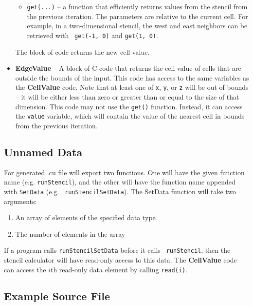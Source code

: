 \documentclass[11pt]{article}
\begin{document}
\begin{itemize}
\begin{itemize}
\item {\tt get(...)} -- a function that efficiently returns values
  from the stencil from the previous iteration.  The parameters are
  relative to the current cell.  For example, in a two-dimensional
  stencil, the west and east neighbors can be retrieved with {\tt
    get(-1, 0)} and {\tt get(1, 0)}.
\end{itemize}
The block of code returns the new cell value.
\item {\bf EdgeValue} -- A block of C code that returns the cell value
  of cells that are outside the bounds of the input.  This code has
  access to the same variables as the {\bf CellValue} code.  Note that
  at least one of {\tt x}, {\tt y}, or {\tt z} will be out of bounds
  -- it will be either less than zero or greater than or equal to the
  size of that dimension.  This code may not use the {\tt get()}
  function.  Instead, it can access the {\tt value} variable, which
  will contain the value of the nearest cell in bounds from the
  previous iteration.
\end{itemize}

\subsection{Unnamed Data}

For generated .cu file will export two functions.  One will have the
given function name (e.g. {\tt runStencil}), and the other will have
the function name appended with {\tt SetData} (e.g. {\tt
  runStencilSetData}).  The SetData function will take two arguments:
\begin{enumerate}
\item An array of elements of the specified data type
\item The number of elements in the array
\end{enumerate}
If a program calls {\tt runStencilSetData} before it calls {\tt
  runStencil}, then the stencil calculator will have read-only access
to this data.  The {\bf CellValue} code can access the $i$th read-only
data element by calling {\tt read(i)}.

\subsection{Example Source File}
\end{document}
